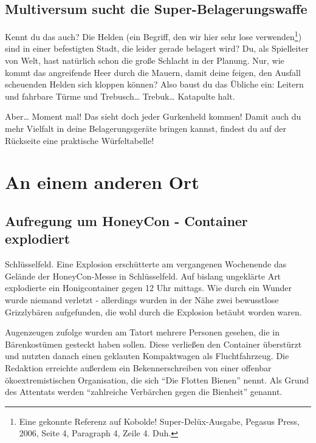 \documentclass[final]{multiversum}
\begin{document}
\makemultititle
%


\subsection{Multiversum sucht die Super-Belagerungswaffe}
Kennt du das auch? 
Die Helden (ein Begriff, den wir hier sehr lose verwenden\footnote{Eine gekonnte Referenz auf Kobolde! Super-Delüx-Ausgabe, Pegasus Press, 2006, Seite 4, Paragraph 4, Zeile 4. Duh.})
 sind in einer befestigten Stadt, die leider gerade belagert wird?
Du, als Spielleiter von Welt, hast natürlich schon die große Schlacht in der Planung.
Nur, wie kommt das angreifende Heer durch die Mauern, damit deine feigen, den Ausfall scheuenden Helden sich kloppen können?
Also baust du das Übliche ein: Leitern und fahrbare Türme und Trebusch\dots{} Trebuk\dots{} Katapulte halt.

Aber\dots{} Moment mal! Das sieht doch jeder Gurkenheld kommen!
Damit auch du mehr Vielfalt in deine Belagerungsgeräte bringen kannst, findest du auf der Rückseite eine praktische Würfeltabelle!

\section{An einem anderen Ort}

\subsection{Aufregung um HoneyCon - Container explodiert}
Schlüsselfeld. Eine Explosion erschütterte am vergangenen Wochenende das Gelände der HoneyCon-Messe in Schlüsselfeld. 
Auf bislang ungeklärte Art explodierte ein Honigcontainer gegen 12 Uhr mittags. 
Wie durch ein Wunder wurde niemand verletzt - allerdings wurden in der Nähe zwei bewusstlose Grizzlybären aufgefunden, die wohl durch die Explosion betäubt worden waren.

Augenzeugen zufolge wurden am Tatort mehrere Personen gesehen, die in Bärenkostümen gesteckt haben sollen. 
Diese verließen den Container überstürzt und nutzten danach einen geklauten Kompaktwagen als Fluchtfahrzeug. 
Die Redaktion erreichte außerdem ein Bekennerschreiben von einer offenbar ökoextremistischen Organisation, die sich \enquote{Die Flotten Bienen} nennt. 
Als Grund des Attentats werden \enquote{zahlreiche Verbärchen gegen die Bienheit} genannt.
\end{document}
